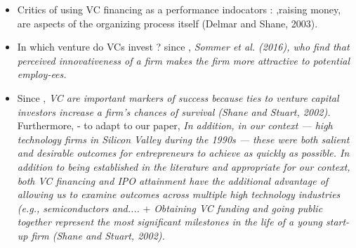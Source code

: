 \begin{itemize}
\begin{itemize}
\begin{itemize}
  \item Critics of using VC financing as a performance indocators : \citep{delmar2006does},raising money, are aspects of the organizing process itself (Delmar and Shane, 2003).
  \item In which venture do VCs invest ? since \citep{siepel2017non}, \textit{Sommer et al. (2016), who find that perceived innovativeness of a firm makes the firm more attractive to potential employ-ees.}
  \item Since \citet{beckman2007early}, \textit{VC are important markers of success because ties to venture capital investors increase a firm’s chances of survival (Shane and Stuart, 2002).} Furthermore, - to adapt to our paper, \textit{In addition, in our context — high technology firms in Silicon Valley during the 1990s — these were both salient and desirable outcomes for entrepreneurs to achieve as quickly as possible. In addition to being established in the literature and appropriate for our context, both VC financing and IPO attainment have the additional advantage of allowing us to examine outcomes across multiple high technology industries (e.g., semiconductors and....} + \textit{Obtaining VC funding and going public together represent the most significant milestones in the life of a young start-up firm (Shane and Stuart, 2002).}
\end{itemize}


\end{itemize}
\end{itemize}

